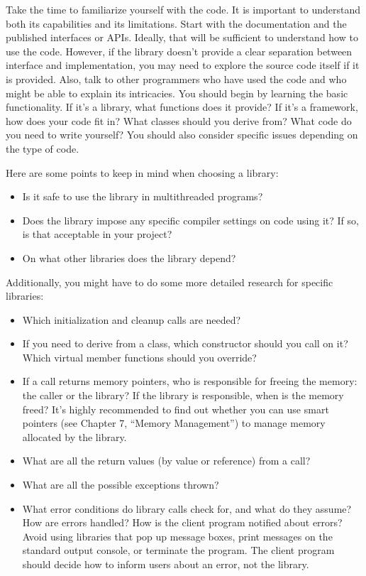 
Take the time to familiarize yourself with the code. It is important to understand both its capabilities and its limitations. Start with the documentation and the published interfaces or APIs. Ideally, that will be sufficient to understand how to use the code. However, if the library doesn’t provide a clear separation between interface and implementation, you may need to explore the source code itself if it is provided. Also, talk to other programmers who have used the code and who might be able to explain its intricacies. You should begin by learning the basic functionality. If it’s a library, what functions does it provide? If it’s a framework, how does your code fit in? What classes should you derive from? What code do you need to write yourself? You should also consider specific issues depending on the type of code.

Here are some points to keep in mind when choosing a library:

\begin{itemize}
\item
Is it safe to use the library in multithreaded programs?

\item
Does the library impose any specific compiler settings on code using it? If so, is that acceptable in your project?

\item
On what other libraries does the library depend?
\end{itemize}

Additionally, you might have to do some more detailed research for specific libraries:

\begin{itemize}
\item
Which initialization and cleanup calls are needed?

\item
If you need to derive from a class, which constructor should you call on it? Which virtual member functions should you override?

\item
If a call returns memory pointers, who is responsible for freeing the memory: the caller or the library? If the library is responsible, when is the memory freed? It’s highly recommended to find out whether you can use smart pointers (see Chapter 7, “Memory Management”) to manage memory allocated by the library.

\item
What are all the return values (by value or reference) from a call?

\item
What are all the possible exceptions thrown?

\item
What error conditions do library calls check for, and what do they assume? How are errors handled? How is the client program notified about errors? Avoid using libraries that pop up message boxes, print messages on the standard output console, or terminate the program. The client program should decide how to inform users about an error, not the library.
\end{itemize}

